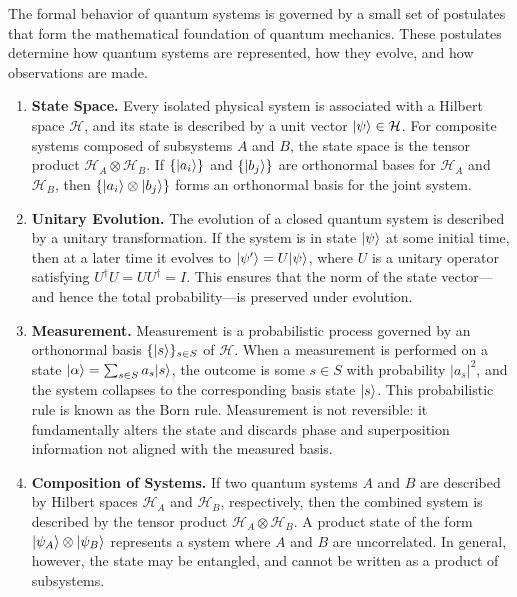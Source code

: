 \documentclass[12pt]{report}
\begin{document}
The formal behavior of quantum systems is governed by a small set of postulates that form the mathematical foundation of quantum mechanics. These postulates determine how quantum systems are represented, how they evolve, and how observations are made.

\begin{enumerate}
  \item \textbf{State Space.} Every isolated physical system is associated with a Hilbert space $\mathcal{H}$, and its state is described by a unit vector $\lvert\psi\rangle \in \mathcal{H}$. For composite systems composed of subsystems $A$ and $B$, the state space is the tensor product $\mathcal{H}_A \otimes \mathcal{H}_B$. If $\{\lvert a_i\rangle\}$ and $\{\lvert b_j\rangle\}$ are orthonormal bases for $\mathcal{H}_A$ and $\mathcal{H}_B$, then $\{\lvert a_i\rangle \otimes \lvert b_j\rangle\}$ forms an orthonormal basis for the joint system.

  \item \textbf{Unitary Evolution.} The evolution of a closed quantum system is described by a unitary transformation. If the system is in state $\lvert\psi\rangle$ at some initial time, then at a later time it evolves to $\lvert\psi'\rangle = U \lvert\psi\rangle$, where $U$ is a unitary operator satisfying $U^\dagger U = U U^\dagger = I$. This ensures that the norm of the state vector—and hence the total probability—is preserved under evolution.

  \item \textbf{Measurement.} Measurement is a probabilistic process governed by an orthonormal basis $\{\lvert s\rangle\}_{s \in S}$ of $\mathcal{H}$. When a measurement is performed on a state $\lvert\alpha\rangle = \sum_{s \in S} a_s \lvert s\rangle$, the outcome is some $s \in S$ with probability $|a_s|^2$, and the system collapses to the corresponding basis state $\lvert s\rangle$. This probabilistic rule is known as the Born rule. Measurement is not reversible: it fundamentally alters the state and discards phase and superposition information not aligned with the measured basis.

  \item \textbf{Composition of Systems.} If two quantum systems $A$ and $B$ are described by Hilbert spaces $\mathcal{H}_A$ and $\mathcal{H}_B$, respectively, then the combined system is described by the tensor product $\mathcal{H}_A \otimes \mathcal{H}_B$. A product state of the form $\lvert\psi_A\rangle \otimes \lvert\psi_B\rangle$ represents a system where $A$ and $B$ are uncorrelated. In general, however, the state may be entangled, and cannot be written as a product of subsystems.
\end{enumerate}
\end{document}
